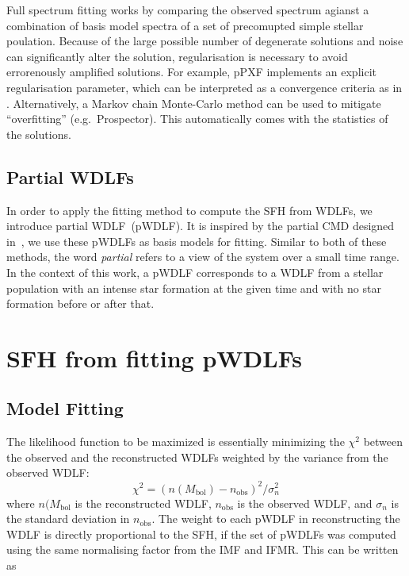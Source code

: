 \documentclass[fleqn,usenatbib]{mnras}
\begin{document}
Full spectrum fitting works by comparing the observed spectrum agianst a
combination of basis model spectra of a set of precomupted simple stellar
poulation. Because of the large possible number of degenerate solutions and
noise can significantly alter the solution, regularisation is necessary
to avoid errorenously amplified solutions. For example, pPXF implements
an explicit regularisation parameter, which can be interpreted as a
convergence criteria as in \citet{2013MNRAS.434.1549R}. Alternatively, a
Markov chain Monte-Carlo method can be used to mitigate ``overfitting''
(e.g.\ Prospector).
This automatically comes with the statistics of the solutions.

\subsection{Partial WDLFs}
In order to apply the fitting method to compute the SFH from WDLFs, we
introduce partial WDLF~(pWDLF). It is inspired by the partial CMD designed
in~\citep{2006A&A...459..783C}, we use these pWDLFs as basis models
for fitting. Similar to both of these methods, the word \textit{partial} 
refers to a view of the system over a small time range. In the context of
this work, a pWDLF corresponds to a WDLF from a stellar population with
an intense star formation at the given time and with no star formation 
before or after that.

\section{SFH from fitting pWDLFs}

\subsection{Model Fitting}
The likelihood function to be maximized is essentially minimizing the
$\chi^2$ between the observed and the reconstructed WDLFs weighted by the
variance from the observed WDLF:
\begin{equation}
\chi^2 = \left(n(M_\mathrm{bol}) - n_\mathrm{obs}\right)^2 / \sigma_n^2
\end{equation}
where $n(M_\mathrm{bol}$ is the reconstructed WDLF, $n_\mathrm{obs}$
is the observed WDLF, and $\sigma_n$ is the standard deviation in
$n_\mathrm{obs}$.  The weight to each pWDLF in reconstructing the WDLF
is directly proportional to the SFH, if the set of pWDLFs was computed
using the same normalising factor from the IMF and IFMR. This can be
written as
\end{document}
